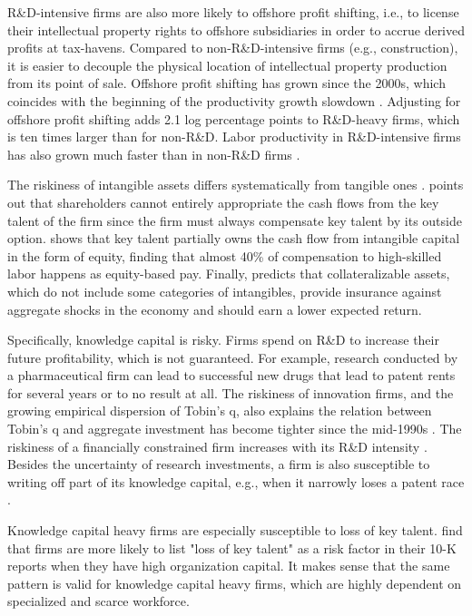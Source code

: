 \documentclass[12pt, letterpaper]{article}
\begin{document}
R\&D-intensive firms are also more likely to offshore profit shifting, i.e., to license their intellectual property rights to offshore subsidiaries in order to accrue derived profits at tax-havens. Compared to non-R\&D-intensive firms (e.g., construction), it is easier to decouple the physical location of intellectual property production from its point of sale. Offshore profit shifting has grown since the 2000s, which coincides with the beginning of the productivity growth slowdown \citep{Fernald2015-io}. Adjusting for offshore profit shifting adds 2.1 log percentage points to R\&D-heavy firms, which is ten times larger than for non-R\&D. Labor productivity in R\&D-intensive firms has also grown much faster than in non-R\&D firms \citep{Guvenen2021-yh}.

The riskiness of intangible assets differs systematically from tangible ones \citep{Hansen2005-xe}. \citep{Eisfeldt2013-ad} points out that shareholders cannot entirely appropriate the cash flows from the key talent of the firm since the firm must always compensate key talent by its outside option. \citep{Eisfeldt2018-iy} shows that key talent partially owns the cash flow from intangible capital in the form of equity, finding that almost 40\% of compensation to high-skilled labor happens as equity-based pay. Finally, \citep{Ai2019-wd} predicts that collateralizable assets, which do not include some categories of intangibles, provide insurance against aggregate shocks in the economy and should earn a lower expected return.

Specifically, knowledge capital is risky. Firms spend on R\&D to increase their future profitability, which is not guaranteed. For example, research conducted by a pharmaceutical firm can lead to successful new drugs that lead to patent rents for several years or to no result at all. The riskiness of innovation firms, and the growing empirical dispersion of Tobin's q, also explains the relation between Tobin's q and aggregate investment has become tighter since the mid-1990s \citep{Andrei2019-bh}. The riskiness of a financially constrained firm increases with its R\&D intensity \citep{Li2011-ay}. Besides the uncertainty of research investments, a firm is also susceptible to writing off part of its knowledge capital, e.g., when it narrowly loses a patent race \citep{Peters2017-fl}.

Knowledge capital heavy firms are especially susceptible to loss of key talent. \citep{Eisfeldt2013-ad} find that firms are more likely to list "loss of key talent" as a risk factor in their 10-K reports when they have high organization capital. It makes sense that the same pattern is valid for knowledge capital heavy firms, which are highly dependent on specialized and scarce workforce.
\end{document}
